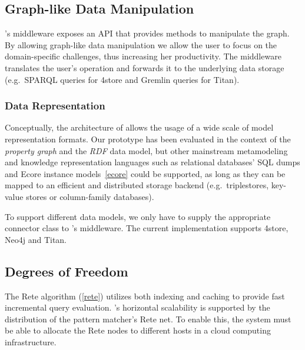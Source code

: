
\subsection{Graph-like Data Manipulation}

\iqd{}'s middleware exposes an API that provides methods to manipulate the graph. By allowing graph-like data manipulation we allow the user to focus on the domain-specific challenges, thus increasing her productivity. The middleware translates the user's operation and forwards it to the underlying data storage (e.g.\ SPARQL queries for 4store and Gremlin queries for Titan).

\subsubsection{Data Representation}

Conceptually, the architecture of \iqd{} allows the usage of a wide scale of model representation formats. Our prototype has been evaluated in the context of the \emph{property graph} and the \emph{RDF} data model, but other mainstream metamodeling and knowledge representation languages such as relational databases' SQL dumps and Ecore instance models~\autoref{ecore} could be supported, as long as they can be mapped to an efficient and distributed storage backend (e.g.\ triplestores, key-value stores or column-family databases).

To support different data models, we only have to supply the appropriate connector class to \iqd{}'s middleware. The current implementation supports 4store, Neo4j and Titan. %


\subsection{Degrees of Freedom}
 
The Rete algorithm (\autoref{rete}) utilizes both indexing and caching to provide fast incremental query evaluation. \iqd{}'s horizontal scalability is supported by the distribution of the pattern matcher's Rete net. To enable this, the system must be able to allocate the Rete nodes to different hosts in a cloud computing infrastructure. 

